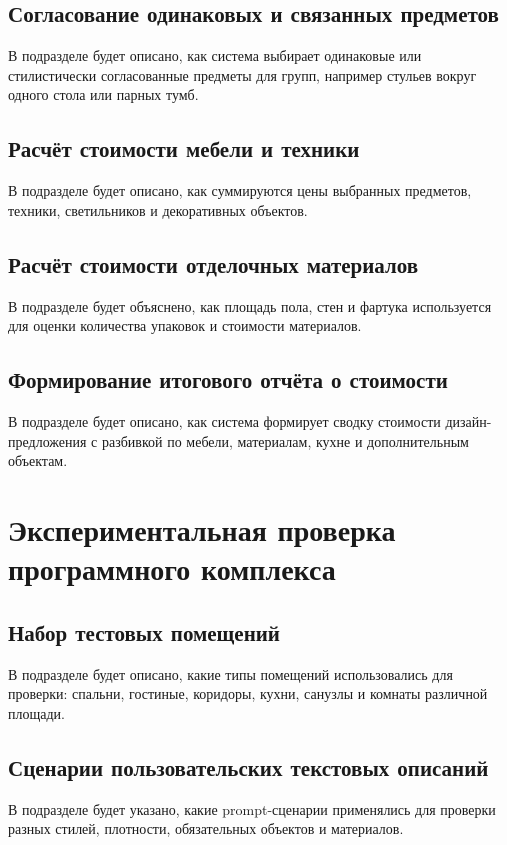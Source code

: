 \documentclass[times]{itmo-student-thesis}
\begin{document}
\subsection{Согласование одинаковых и связанных предметов}
В подразделе будет описано, как система выбирает одинаковые или стилистически согласованные предметы для групп, например стульев вокруг одного стола или парных тумб.

\subsection{Расчёт стоимости мебели и техники}
В подразделе будет описано, как суммируются цены выбранных предметов, техники, светильников и декоративных объектов.

\subsection{Расчёт стоимости отделочных материалов}
В подразделе будет объяснено, как площадь пола, стен и фартука используется для оценки количества упаковок и стоимости материалов.

\subsection{Формирование итогового отчёта о стоимости}
В подразделе будет описано, как система формирует сводку стоимости дизайн-предложения с разбивкой по мебели, материалам, кухне и дополнительным объектам.

\section{Экспериментальная проверка программного комплекса}

\subsection{Набор тестовых помещений}
В подразделе будет описано, какие типы помещений использовались для проверки: спальни, гостиные, коридоры, кухни, санузлы и комнаты различной площади.

\subsection{Сценарии пользовательских текстовых описаний}
В подразделе будет указано, какие prompt-сценарии применялись для проверки разных стилей, плотности, обязательных объектов и материалов.
\end{document}

